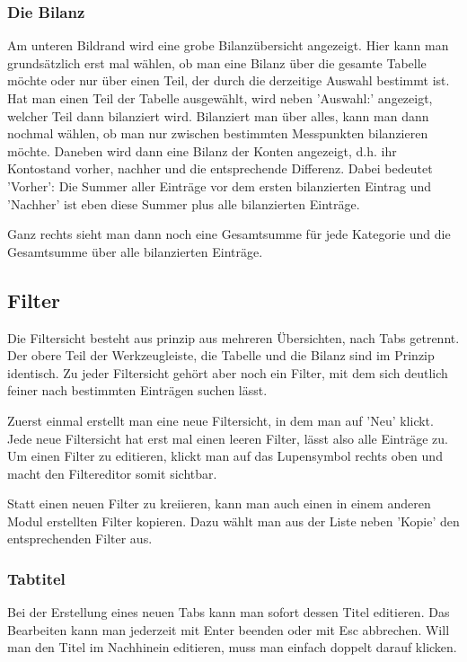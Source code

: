 \documentclass[a4paper,10pt,halfparskip,oneside,smallheadings]{scrbook}
\begin{document}
\subsubsection{Die Bilanz}
Am unteren Bildrand wird eine grobe Bilanzübersicht angezeigt. Hier kann man grundsätzlich erst mal wählen, ob man eine Bilanz über die gesamte Tabelle möchte oder nur über einen Teil, der durch die derzeitige Auswahl bestimmt ist. Hat man einen Teil der Tabelle ausgewählt, wird neben 'Auswahl:' angezeigt, welcher Teil dann bilanziert wird.
Bilanziert man über alles, kann man dann nochmal wählen, ob man nur zwischen bestimmten Messpunkten bilanzieren möchte.	Daneben wird dann eine Bilanz der Konten angezeigt, d.h. ihr Kontostand vorher, nachher und die entsprechende Differenz. Dabei bedeutet 'Vorher': Die Summer aller Einträge vor dem ersten bilanzierten Eintrag und 'Nachher' ist eben diese Summer plus alle bilanzierten Einträge.

Ganz rechts sieht man dann noch eine Gesamtsumme für jede Kategorie und die Gesamtsumme über alle bilanzierten Einträge.

\subsection{Filter}
Die Filtersicht besteht aus prinzip aus mehreren Übersichten, nach Tabs getrennt. Der obere Teil der Werkzeugleiste, die Tabelle und die Bilanz sind im Prinzip identisch. Zu jeder Filtersicht gehört aber noch ein Filter, mit dem sich deutlich feiner nach bestimmten Einträgen suchen lässt.

Zuerst einmal erstellt man eine neue Filtersicht, in dem man auf 'Neu' klickt. Jede neue Filtersicht hat erst mal einen leeren Filter, lässt also alle Einträge zu. Um einen Filter zu editieren, klickt man auf das Lupensymbol rechts oben und macht den Filtereditor somit sichtbar. 

Statt einen neuen Filter zu kreiieren, kann man auch einen in einem anderen Modul erstellten Filter kopieren. Dazu wählt man aus der Liste neben 'Kopie' den entsprechenden Filter aus.

\subsubsection{Tabtitel}
Bei der Erstellung eines neuen Tabs kann man sofort dessen Titel editieren. Das Bearbeiten kann man jederzeit mit Enter beenden oder mit Esc abbrechen. Will man den Titel im Nachhinein editieren, muss man einfach doppelt darauf klicken.
\end{document}
